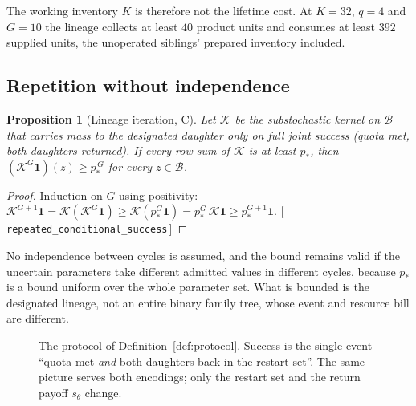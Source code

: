 \documentclass[11pt]{article}
\theoremstyle{plain}
\newtheorem{proposition}[theorem]{Proposition}
\theoremstyle{definition}
\theoremstyle{remark}
\newcommand{\one}{\mathbf{1}}
\newcommand{\leanref}[1]{{\normalfont\sffamily\footnotesize[\,#1\,]}}
\begin{document}
The working inventory $K$ is therefore not the lifetime cost. At $K=32$, $q=4$
and $G=10$ the lineage collects at least $40$ product units and consumes at
least $392$ supplied units, the unoperated siblings' prepared inventory
included.

\subsection{Repetition without independence}

\begin{proposition}[Lineage iteration, C]\label{prop:iterate}
Let $\mathcal{K}$ be the substochastic kernel on $\mathcal{B}$ that carries
mass to the designated daughter only on full joint success (quota met, both
daughters returned). If every row sum of $\mathcal{K}$ is at least $p_*$, then
$(\mathcal{K}^{G}\one)(z)\ge p_*^{\,G}$ for every $z\in\mathcal{B}$.
\end{proposition}

\begin{proof}
Induction on $G$ using positivity: $\mathcal{K}^{G+1}\one=
\mathcal{K}(\mathcal{K}^{G}\one)\ge\mathcal{K}(p_*^{G}\one)
=p_*^{G}\,\mathcal{K}\one\ge p_*^{G+1}\one$.
\leanref{\texttt{repeated\_conditional\_success}}
\end{proof}

No independence between cycles is assumed, and the bound remains valid if the
uncertain parameters take different admitted values in different cycles,
because $p_*$ is a bound uniform over the whole parameter set. What is bounded
is the designated lineage, not an entire binary family tree, whose event and
resource bill are different.

\begin{figure}[t]
\centering
{}
\caption{The protocol of Definition~\ref{def:protocol}. Success is the single
event ``quota met \emph{and} both daughters back in the restart set''. The
same picture serves both encodings; only the restart set and the return
payoff $s_\theta$ change.}
\label{fig:protocol}
\end{figure}
\end{document}
